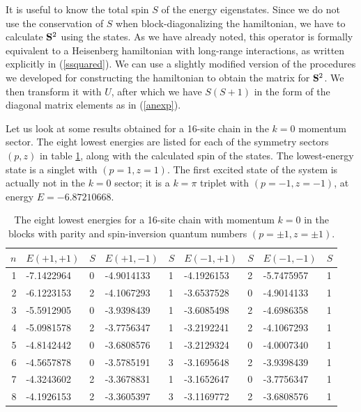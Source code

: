 \documentclass[draft,numberedheadings]{aipproc}
\begin{document}
It is useful to know the total spin $S$ of the energy eigenstates. Since we do not use the conservation of $S$ when block-diagonalizing 
the hamiltonian, we have to calculate ${\bf S}^2$ using the states. As we have already noted, this operator is formally equivalent to a Heisenberg hamiltonian 
with long-range interactions, as written explicitly in (\ref{ssquared}). We can use a slightly modified version of the procedures we developed for 
constructing the hamiltonian to obtain the matrix for ${\bf S}^2$. We then transform it with $U$, after which we have $S(S+1)$ in the form of the 
diagonal matrix elements as in (\ref{anexp}). 

Let us look at some results obtained for a 16-site chain in the $k=0$ momentum sector. The eight lowest energies 
are listed for each of the symmetry sectors $(p,z)$ in table \ref{estab}, along with the calculated spin of the states. The lowest-energy state is a singlet 
with $(p=1,z=1)$. The first excited state of the system is actually not in the $k=0$ sector; it is a $k=\pi$ triplet with $(p=-1,z=-1)$, at energy 
$E=-6.87210668$.

\begin{table}
\begin{tabular}{rllllllll}
\hline
$n$ & $E(+1,+1)$  &$S$& $E(+1,-1)$  &$S$& $E(-1,+1)$  &$S$& $E(-1,-1)$ &$S$  \\
\hline
  1 & -7.1422964 & 0 & -4.9014133 & 1 & -4.1926153 & 2 & -5.7475957 & 1\\
  2 & -6.1223153 & 2 & -4.1067293 & 1 & -3.6537528 & 0 & -4.9014133 & 1\\
  3 & -5.5912905 & 0 & -3.9398439 & 1 & -3.6085498 & 2 & -4.6986358 & 1\\
  4 & -5.0981578 & 2 & -3.7756347 & 1 & -3.2192241 & 2 & -4.1067293 & 1\\         
  5 & -4.8142442 & 0 & -3.6808576 & 1 & -3.2129324 & 0 & -4.0007340 & 1\\
  6 & -4.5657878 & 0 & -3.5785191 & 3 & -3.1695648 & 2 & -3.9398439 & 1\\
  7 & -4.3243602 & 2 & -3.3678831 & 1 & -3.1652647 & 0 & -3.7756347 & 1\\
  8 & -4.1926153 & 2 & -3.3605397 & 3 & -3.1169772 & 2 & -3.6808576 & 1\\
\hline
\end{tabular}
\label{estab}
\caption{The eight lowest energies for a 16-site chain with momentum $k=0$ in the blocks with parity and spin-inversion 
quantum numbers $(p=\pm 1,z=\pm 1)$.}
\end{table}
\end{document}
